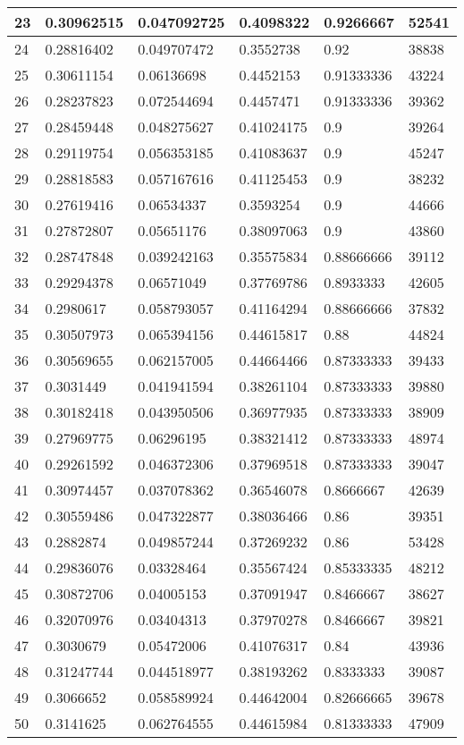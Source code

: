 \begin{longtable}{|l|l|l|l|l|l|}
23 & 0.30962515 & 0.047092725 & 0.4098322 & 0.9266667 & 52541 \\ \hline 
24 & 0.28816402 & 0.049707472 & 0.3552738 & 0.92 & 38838 \\ \hline 
25 & 0.30611154 & 0.06136698 & 0.4452153 & 0.91333336 & 43224 \\ \hline 
26 & 0.28237823 & 0.072544694 & 0.4457471 & 0.91333336 & 39362 \\ \hline 
27 & 0.28459448 & 0.048275627 & 0.41024175 & 0.9 & 39264 \\ \hline 
28 & 0.29119754 & 0.056353185 & 0.41083637 & 0.9 & 45247 \\ \hline 
29 & 0.28818583 & 0.057167616 & 0.41125453 & 0.9 & 38232 \\ \hline 
30 & 0.27619416 & 0.06534337 & 0.3593254 & 0.9 & 44666 \\ \hline 
31 & 0.27872807 & 0.05651176 & 0.38097063 & 0.9 & 43860 \\ \hline 
32 & 0.28747848 & 0.039242163 & 0.35575834 & 0.88666666 & 39112 \\ \hline 
33 & 0.29294378 & 0.06571049 & 0.37769786 & 0.8933333 & 42605 \\ \hline 
34 & 0.2980617 & 0.058793057 & 0.41164294 & 0.88666666 & 37832 \\ \hline 
35 & 0.30507973 & 0.065394156 & 0.44615817 & 0.88 & 44824 \\ \hline 
36 & 0.30569655 & 0.062157005 & 0.44664466 & 0.87333333 & 39433 \\ \hline 
37 & 0.3031449 & 0.041941594 & 0.38261104 & 0.87333333 & 39880 \\ \hline 
38 & 0.30182418 & 0.043950506 & 0.36977935 & 0.87333333 & 38909 \\ \hline 
39 & 0.27969775 & 0.06296195 & 0.38321412 & 0.87333333 & 48974 \\ \hline 
40 & 0.29261592 & 0.046372306 & 0.37969518 & 0.87333333 & 39047 \\ \hline 
41 & 0.30974457 & 0.037078362 & 0.36546078 & 0.8666667 & 42639 \\ \hline 
42 & 0.30559486 & 0.047322877 & 0.38036466 & 0.86 & 39351 \\ \hline 
43 & 0.2882874 & 0.049857244 & 0.37269232 & 0.86 & 53428 \\ \hline 
44 & 0.29836076 & 0.03328464 & 0.35567424 & 0.85333335 & 48212 \\ \hline 
45 & 0.30872706 & 0.04005153 & 0.37091947 & 0.8466667 & 38627 \\ \hline 
46 & 0.32070976 & 0.03404313 & 0.37970278 & 0.8466667 & 39821 \\ \hline 
47 & 0.3030679 & 0.05472006 & 0.41076317 & 0.84 & 43936 \\ \hline 
48 & 0.31247744 & 0.044518977 & 0.38193262 & 0.8333333 & 39087 \\ \hline 
49 & 0.3066652 & 0.058589924 & 0.44642004 & 0.82666665 & 39678 \\ \hline 
50 & 0.3141625 & 0.062764555 & 0.44615984 & 0.81333333 & 47909 \\ \hline 
\end{longtable}